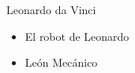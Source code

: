 
\begin{frame}[fragile]{Leonardo da Vinci}
\vspace{8px}
\pause
{}
\begin{block}{}
	\begin{itemize}
		\item El robot de Leonardo
		\pause
		\item León Mecánico
	\end{itemize}
\end{block}
\end{frame}















